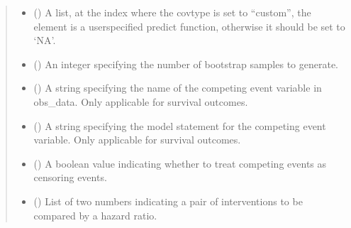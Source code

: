 \documentclass[letterpaper,10pt,english]{sphinxmanual}
\begin{document}
\begin{fulllineitems}
\begin{quote}
\begin{description}
\begin{itemize}
\item {} 
\sphinxAtStartPar
{} (\sphinxstyleliteralemphasis{\sphinxupquote{, }}) \textendash{} A list, at the index where the covtype is set to “custom”, the element is a user\sphinxhyphen{}specified predict function,
otherwise it should be set to ‘NA’.

\item {} 
\sphinxAtStartPar
{} (\sphinxstyleliteralemphasis{\sphinxupquote{, }}) \textendash{} An integer specifying the number of bootstrap samples to generate.

\item {} 
\sphinxAtStartPar
{} (\sphinxstyleliteralemphasis{\sphinxupquote{, }}) \textendash{} A string specifying the name of the competing event variable in obs\_data. Only applicable for survival outcomes.

\item {} 
\sphinxAtStartPar
{} (\sphinxstyleliteralemphasis{\sphinxupquote{, }}) \textendash{} A string specifying the model statement for the competing event variable. Only applicable for survival outcomes.

\item {} 
\sphinxAtStartPar
{} (\sphinxstyleliteralemphasis{\sphinxupquote{, }}) \textendash{} A boolean value indicating whether to treat competing events as censoring events.

\item {} 
\sphinxAtStartPar
{} (\sphinxstyleliteralemphasis{\sphinxupquote{, }}) \textendash{} List of two numbers indicating a pair of interventions to be compared by a hazard ratio.


\end{itemize}
\end{description}
\end{quote}
\end{fulllineitems}
\end{document}
